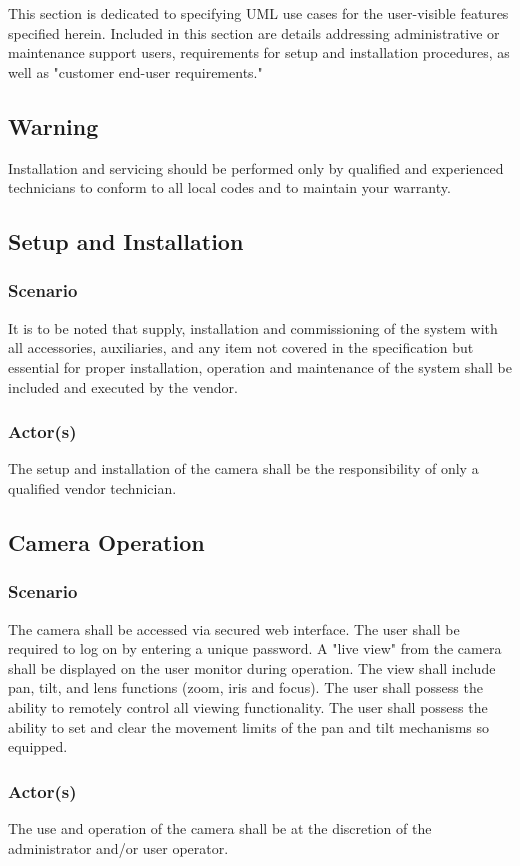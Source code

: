 This section is dedicated to specifying UML use cases for the user-visible features specified herein. Included in this section are details addressing administrative or maintenance support users, requirements for setup and installation procedures, as well as "customer end-user requirements."
\subsection{Warning}
Installation and servicing should be performed only by qualified and experienced technicians to conform to all local codes and to maintain your warranty.
\subsection{Setup and Installation}
\subsubsection{Scenario}
It is to be noted that supply, installation and commissioning of the system with all accessories, auxiliaries, and any item not covered in the specification but essential for proper installation, operation and maintenance of the system shall be included and executed by the vendor.
\subsubsection{Actor(s)}
The setup and installation of the camera shall be the responsibility of only a qualified vendor technician.
\subsection{Camera Operation}
\subsubsection{Scenario}
The camera shall be accessed via secured web interface.
The user shall be required to log on by entering a unique password.
A "live view" from the camera shall be displayed on the user monitor during operation. 
The view shall include pan, tilt, and lens functions (zoom, iris and focus). 
The user shall possess the ability to remotely control all viewing functionality.
The user shall possess the ability to set and clear the movement limits of the pan and tilt mechanisms so equipped.
\subsubsection{Actor(s)}
The use and operation of the camera shall be at the discretion of the administrator and/or user operator.
